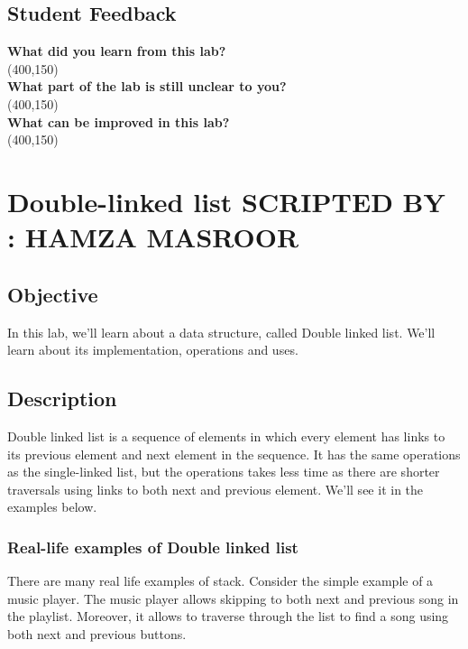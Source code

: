\documentclass[11pt,fleqn]{book} %
\begin{document}
 \newpage
 \section{Student Feedback}
 \textbf{What did you learn from this lab?}\\ 
 \framebox(400,150){}\\
 \textbf{What part of the lab is still unclear to you?}\\
 \framebox(400,150){}\\
 \textbf{What can be improved in this lab?}\\ 
 \framebox(400,150){}\\

\newpage
{} %
\chapter{Double-linked list \hspace{40mm} {\textsc{\small SCRIPTED BY : HAMZA MASROOR}}}
\section{Objective}
In this lab, we'll learn about a data structure, called Double linked list. We'll learn about its implementation, operations and uses.
\section{Description}
Double linked list is a sequence of elements in which every element has links to its previous element and next element in the sequence.
It has the same operations as the single-linked list, but the operations takes less time as there are shorter traversals using links to both next and previous element. We'll see it in the examples below.
 
\subsection{Real-life examples of Double linked list}
There are many real life examples of stack. Consider the simple example of a music player. The music player allows skipping to both next and previous song in the playlist. Moreover, it allows to traverse through the list to find a song using both next and previous buttons.
\end{document}
